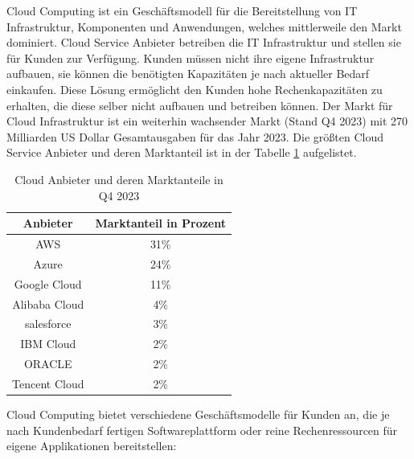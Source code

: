 Cloud Computing ist ein Geschäftsmodell für die Bereitstellung von IT Infrastruktur, Komponenten und Anwendungen, welches mittlerweile den Markt dominiert. \cite{Benlian2018} Cloud Service Anbieter betreiben die IT Infrastruktur und stellen sie für Kunden zur Verfügung. Kunden müssen nicht ihre eigene Infrastruktur aufbauen, sie können die benötigten Kapazitäten je nach aktueller Bedarf einkaufen. Diese Lösung ermöglicht den Kunden hohe Rechenkapazitäten zu erhalten, die diese selber nicht aufbauen und betreiben können.\cite{Arasaratnam2011} Der Markt für Cloud Infrastruktur ist ein weiterhin wachsender Markt (Stand Q4 2023) mit 270 Milliarden US Dollar Gesamtausgaben für das Jahr 2023. Die größten Cloud Service Anbieter und deren Marktanteil ist in der Tabelle \ref{cloud_marktanteile} aufgelistet.

\begin{table}
	\centering
		\caption{Cloud Anbieter und deren Marktanteile in Q4 2023} 
		\label{cloud_marktanteile}
		\begin{tabular}{|c | c|} 
			\hline
			Anbieter & Marktanteil in Prozent \\
			\hline\hline
			AWS & 31\%\\ 
			\hline
			Azure & 24\% \\
			\hline
			Google Cloud & 11\% \\
			\hline
			Alibaba Cloud & 4\% \\
			\hline
			salesforce & 3\% \\
			\hline
			IBM Cloud & 2\% \\ 
			\hline
			ORACLE & 2\% \\ 
			\hline
			Tencent Cloud & 2\% \\ 
			\hline
		\end{tabular}
\end{table}

Cloud Computing bietet verschiedene Geschäftsmodelle für Kunden an, die je nach Kundenbedarf fertigen Softwareplattform oder reine Rechenressourcen für eigene Applikationen bereitstellen:


